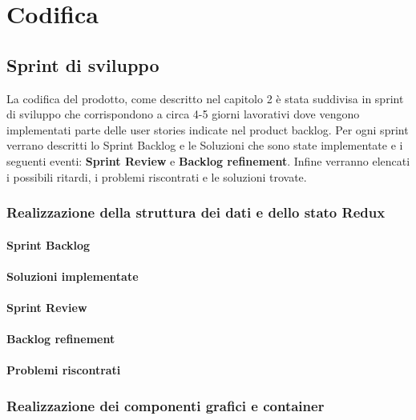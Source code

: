 
\chapter{Codifica}
\label{cap:codifica}

\section{Sprint di sviluppo}
La codifica del prodotto, come descritto nel capitolo 2 è stata suddivisa in sprint di sviluppo che corrispondono a circa 4-5 giorni lavorativi dove vengono implementati parte delle user stories indicate nel product backlog. Per ogni sprint verrano descritti lo Sprint Backlog e le Soluzioni che sono state implementate e i seguenti eventi: \textbf{Sprint Review} e \textbf{Backlog refinement}.
Infine verranno elencati i possibili ritardi, i problemi riscontrati e le soluzioni trovate.

\subsection{Realizzazione della struttura dei dati e dello stato Redux}
\subsubsection{Sprint Backlog}
\subsubsection{Soluzioni implementate}
\subsubsection{Sprint Review}
\subsubsection{Backlog refinement}
\subsubsection{Problemi riscontrati}

\subsection{Realizzazione dei componenti grafici e container}
